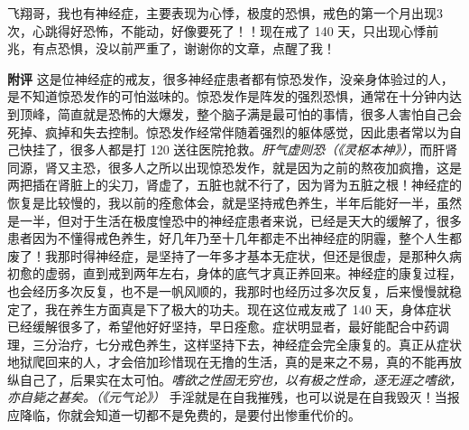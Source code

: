 \begin{case}
    飞翔哥，我也有神经症，主要表现为心悸，极度的恐惧，戒色的第一个月出现3次，心跳得好恐怖，不能动，好像要死了！！现在戒了 140 天，只出现心悸前兆，有点恐惧，没以前严重了，谢谢你的文章，点醒了我！

    \textbf{附评} 这是位神经症的戒友，很多神经症患者都有惊恐发作，没亲身体验过的人，是不知道惊恐发作的可怕滋味的。惊恐发作是阵发的强烈恐惧，通常在十分钟内达到顶峰，简直就是恐怖的大爆发，整个脑子满是最可怕的事情，很多人害怕自己会死掉、疯掉和失去控制。惊恐发作经常伴随着强烈的躯体感觉，因此患者常以为自己快挂了，很多人都是打 120 送往医院抢救。\textit{肝气虚则恐（《灵枢本神》）}，而肝肾同源，肾又主恐，很多人之所以出现惊恐发作，就是因为之前的熬夜加疯撸，这是两把插在肾脏上的尖刀，肾虚了，五脏也就不行了，因为肾为五脏之根！神经症的恢复是比较慢的，我以前的痊愈体会，就是坚持戒色养生，半年后能好一半，虽然是一半，但对于生活在极度惶恐中的神经症患者来说，已经是天大的缓解了，很多患者因为不懂得戒色养生，好几年乃至十几年都走不出神经症的阴霾，整个人生都废了！我那时得神经症，是坚持了一年多才基本无症状，但还是很虚，是那种久病初愈的虚弱，直到戒到两年左右，身体的底气才真正养回来。神经症的康复过程，也会经历多次反复，也不是一帆风顺的，我那时也经历过多次反复，后来慢慢就稳定了，我在养生方面真是下了极大的功夫。现在这位戒友戒了 140 天，身体症状已经缓解很多了，希望他好好坚持，早日痊愈。症状明显者，最好能配合中药调理，三分治疗，七分戒色养生，这样坚持下去，神经症会完全康复的。真正从症状地狱爬回来的人，才会倍加珍惜现在无撸的生活，真的是来之不易，真的不能再放纵自己了，后果实在太可怕。\textit{嗜欲之性固无穷也，以有极之性命，逐无涯之嗜欲，亦自毙之甚矣。（《元气论》）} 手淫就是在自我摧残，也可以说是在自我毁灭！当报应降临，你就会知道一切都不是免费的，是要付出惨重代价的。
\end{case}

